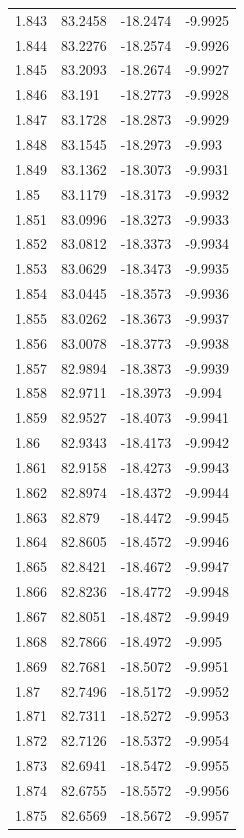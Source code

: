 \begin{tabular}{llll}
1.843 & 83.2458 & -18.2474 & -9.9925 \\
1.844 & 83.2276 & -18.2574 & -9.9926 \\
1.845 & 83.2093 & -18.2674 & -9.9927 \\
1.846 & 83.191 & -18.2773 & -9.9928 \\
1.847 & 83.1728 & -18.2873 & -9.9929 \\
1.848 & 83.1545 & -18.2973 & -9.993 \\
1.849 & 83.1362 & -18.3073 & -9.9931 \\
1.85 & 83.1179 & -18.3173 & -9.9932 \\
1.851 & 83.0996 & -18.3273 & -9.9933 \\
1.852 & 83.0812 & -18.3373 & -9.9934 \\
1.853 & 83.0629 & -18.3473 & -9.9935 \\
1.854 & 83.0445 & -18.3573 & -9.9936 \\
1.855 & 83.0262 & -18.3673 & -9.9937 \\
1.856 & 83.0078 & -18.3773 & -9.9938 \\
1.857 & 82.9894 & -18.3873 & -9.9939 \\
1.858 & 82.9711 & -18.3973 & -9.994 \\
1.859 & 82.9527 & -18.4073 & -9.9941 \\
1.86 & 82.9343 & -18.4173 & -9.9942 \\
1.861 & 82.9158 & -18.4273 & -9.9943 \\
1.862 & 82.8974 & -18.4372 & -9.9944 \\
1.863 & 82.879 & -18.4472 & -9.9945 \\
1.864 & 82.8605 & -18.4572 & -9.9946 \\
1.865 & 82.8421 & -18.4672 & -9.9947 \\
1.866 & 82.8236 & -18.4772 & -9.9948 \\
1.867 & 82.8051 & -18.4872 & -9.9949 \\
1.868 & 82.7866 & -18.4972 & -9.995 \\
1.869 & 82.7681 & -18.5072 & -9.9951 \\
1.87 & 82.7496 & -18.5172 & -9.9952 \\
1.871 & 82.7311 & -18.5272 & -9.9953 \\
1.872 & 82.7126 & -18.5372 & -9.9954 \\
1.873 & 82.6941 & -18.5472 & -9.9955 \\
1.874 & 82.6755 & -18.5572 & -9.9956 \\
1.875 & 82.6569 & -18.5672 & -9.9957 \\

\end{tabular}

